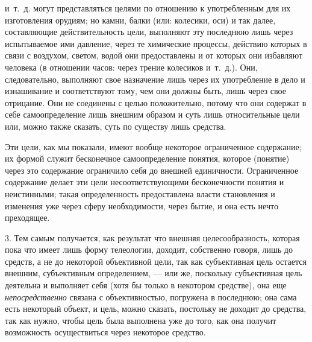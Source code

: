 \documentclass[twoside]{article}
\begin{document}
{{{{и~т.~д. могут представляться целями по отношению к употребленным для их
изготовления орудиям; но камни, балки (или: колесики, оси) и так далее,
составляющие действительность цели, выполняют эту последнюю лишь через
испытываемое ими давление, через те химические процессы, действию которых в
связи с воздухом, светом, водой они предоставлены и от которых они
избавляют человека (в отношении часов: через трение колесиков и~т.~д.).
Они, следовательно, выполняют свое назначение лишь через их употребление в
дело и изнашивание и соответствуют тому, чем они должны быть, лишь через
свое отрицание. Они не соединены с целью положительно, потому что они
содержат в себе самоопределение лишь внешним образом и суть лишь
относительные цели или, можно также сказать, суть по существу лишь
средства.

Эти цели, как мы показали, имеют вообще некоторое ограниченное
содержание; их формой служит бесконечное самоопределение понятия, которое
(понятие) через это содержание ограничило себя до внешней единичности.
Ограниченное содержание делает эти цели несоответствующими бесконечности
понятия и неистинными; такая определенность предоставлена власти
становления и изменения уже через сферу необходимости, через бытие, и она
есть нечто преходящее.

3. Тем самым получается, как результат что внешняя
целесообразность, которая пока что имеет лишь форму телеологии, доходит,
собственно говоря, лишь до средств, а не до некоторой объективной цели, так
как субъективная цель остается внешним, субъективным определением, —
или же, поскольку субъективная цель деятельна и выполняет
себя (хотя бы только в некотором средстве), она еще
{\em непосредственно}
связана с объективностью, погружена в последнюю; она сама
есть некоторый объект, и цель, можно сказать, постольку не доходит до
средства, так как нужно, чтобы цель была выполнена уже до того, как она
получит возможность осуществиться через некоторое средство.

}}}}
\end{document}
